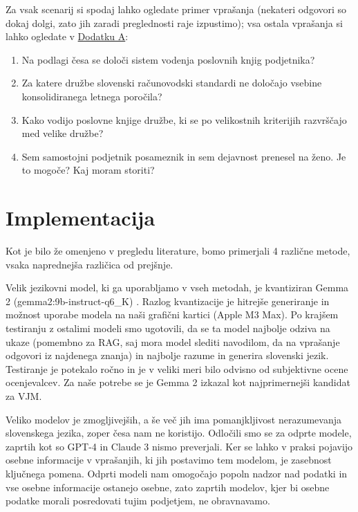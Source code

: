 \documentclass[a4paper,12pt,openright]{book}
\begin{document}
Za vsak scenarij si spodaj lahko ogledate primer vprašanja (nekateri odgovori so dokaj dolgi, zato jih zaradi preglednosti raje izpustimo); vsa ostala vprašanja si lahko ogledate v \hyperref[appendix_a]{Dodatku A}:

\begin{enumerate}
    \item Na podlagi česa se določi sistem vodenja poslovnih knjig podjetnika?
    \item Za katere družbe slovenski računovodski standardi ne določajo vsebine konsolidiranega letnega poročila?
    \item Kako vodijo poslovne knjige družbe, ki se po velikostnih kriterijih razvrščajo med velike družbe?
    \item Sem samostojni podjetnik posameznik in sem dejavnost prenesel na ženo. Je to mogoče? Kaj moram storiti?
\end{enumerate}

\chapter{Implementacija}
\label{ch3}

Kot je bilo že omenjeno v pregledu literature, bomo primerjali 4 različne metode, vsaka naprednejša različica od prejšnje.

Velik jezikovni model, ki ga uporabljamo v vseh metodah, je kvantiziran Gemma 2 (gemma2:9b-instruct-q6\_K) \cite{gemma2}. Razlog kvantizacije je hitrejše generiranje in možnost uporabe modela na naši grafični kartici (Apple M3 Max). Po krajšem testiranju z ostalimi modeli smo ugotovili, da se ta model najbolje odziva na ukaze (pomembno za RAG, saj mora model slediti navodilom, da na vprašanje odgovori iz najdenega znanja) in najbolje razume in generira slovenski jezik. Testiranje je potekalo ročno in je v veliki meri bilo odvisno od subjektivne ocene ocenjevalcev. Za naše potrebe se je Gemma 2 izkazal kot najprimernejši kandidat za VJM.

Veliko modelov je zmogljivejših, a še več jih ima pomanjkljivost nerazumevanja slovenskega jezika, zoper česa nam ne koristijo. Odločili smo se za odprte modele, zaprtih kot so GPT-4 in Claude 3 nismo preverjali. Ker se lahko v praksi pojavijo osebne informacije v vprašanjih, ki jih postavimo tem modelom, je zasebnost ključnega pomena. Odprti modeli nam omogočajo popoln nadzor nad podatki in vse osebne informacije ostanejo osebne, zato zaprtih modelov, kjer bi osebne podatke morali posredovati tujim podjetjem, ne obravnavamo.
\end{document}
